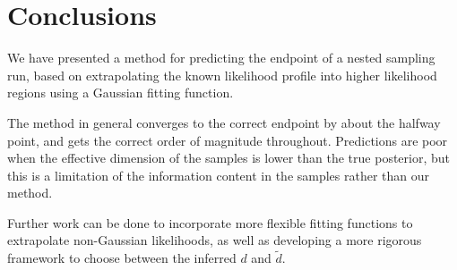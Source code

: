 \documentclass[usenatbib]{mnras}
\begin{document}
\section{Conclusions}\label{sec:conclusions}
We have presented a method for predicting the endpoint of a nested sampling run, based on extrapolating the known likelihood profile into higher likelihood regions using a Gaussian fitting function.
\par
The method in general converges to the correct endpoint by about the halfway point, and gets the correct order of magnitude throughout. Predictions are poor when the effective dimension of the samples is lower than the true posterior, but this is a limitation of the information content in the samples rather than our method.
\par
Further work can be done to incorporate more flexible fitting functions to extrapolate non-Gaussian likelihoods, as well as developing a more rigorous framework to choose between the inferred $d$ and $\tilde{d}$.




\appendix
\end{document}
